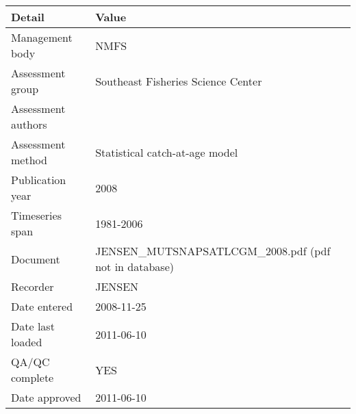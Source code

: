 \begin{table}[htb]
\centering
\begin{tabular}{lp{7cm}}
\toprule
Detail & Value \\
\midrule
Management body    & NMFS                                                   \\
Assessment group   & Southeast Fisheries Science Center                     \\
Assessment authors &                                                        \\
Assessment method  & Statistical catch-at-age model                         \\
Publication year   & 2008                                                   \\
Timeseries span    & 1981-2006                                              \\
Document           & JENSEN\_MUTSNAPSATLCGM\_2008.pdf (pdf not in database) \\
Recorder           & JENSEN                                                 \\
Date entered       & 2008-11-25                                             \\
Date last loaded   & 2011-06-10                                             \\
QA/QC complete     & YES                                                    \\
Date approved      & 2011-06-10                                             \\
\bottomrule
\end{tabular}
\label{tab:assessdet}
\end{table}
